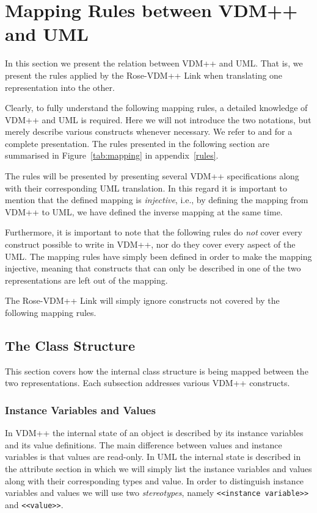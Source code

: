 \documentclass[\pformat,12pt]{article}
\newcommand{\vdmpp}{VDM++}
\newcommand{\link}{Rose-\vdmpp{} Link}
\begin{document}
\newpage  
\section{Mapping Rules between VDM++ and UML}
\label{mapping}
  
In this section we present the relation between \vdmpp{} and UML. That is, we present the   
rules applied by the \link{} when translating one representation into the other.  

Clearly, to fully understand the following mapping rules, a detailed knowledge of \vdmpp{}   
and UML is required. Here we will not introduce the two notations, but merely describe   
various constructs whenever necessary. We refer to \cite{LangManPP-CSK} and \cite{Booch&97} for a   
complete presentation.  
The rules presented in the following section are summarised in Figure~\ref{tab:mapping} in appendix~\ref{rules}.  

The rules will be presented by presenting several \vdmpp{}
specifications along with their corresponding UML translation. In this
regard it is important to mention that the defined mapping is {\it
  injective}, i.e., by defining the mapping from \vdmpp{} to UML, we
have defined the inverse mapping at the same time.
 
Furthermore, it is important to note that the following rules do {\it not} cover every construct   
possible to write in \vdmpp{}, nor do they cover every aspect of the UML. The mapping   
rules have simply been defined in order to make the mapping injective, meaning that   
constructs that can only be described in one of the two representations are left out of the   
mapping.  

The \link{} will simply ignore constructs not covered by the following   
mapping rules.  

\subsection{The Class Structure}
\label{classstructure}
  
This section covers how the internal class structure is being mapped between the two   
representations. Each subsection addresses various \vdmpp{} constructs.  

\subsubsection*{Instance Variables and Values}
  
In \vdmpp{} the internal state of an object is described by its instance variables and its value   
definitions. The main difference between values and instance variables is that values are   
read-only. In UML the internal state is described in the attribute section in which we will   
simply list the instance variables and values along with their corresponding types and   
value. In order to distinguish instance variables and values we will use two {\it stereotypes},   
namely {\tt <<instance variable>>} and {\tt <<value>>}.  
\end{document}
